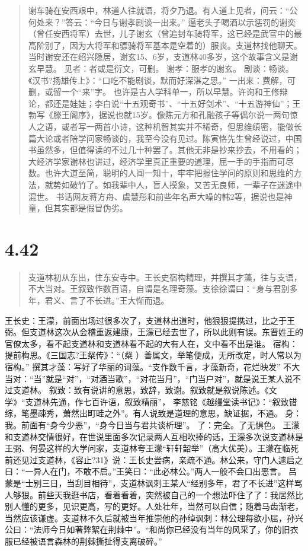 \documentclass[]{book}
\begin{document}
\begin{quote}
谢车骑在安西艰中，林道人往就语，将夕乃退。有人道上见者，问云：``公何处来？''答云：``今日与谢孝剧谈一出来。''
逼老头子喝酒以示惩罚的谢奕（曾任安西将军）去世，儿子谢玄（曾追封车骑将军，这已经是武官中的最高阶别了，因为大将军和骠骑将军基本是空着的）服丧。支道林找他聊天。当时谢安还在绍兴隐居，谢玄15、6岁，支道林40多岁，这个故事含义是谢玄早慧。
见者：者或是衍文，可删。 谢孝：服孝的谢玄。
剧谈：畅谈。《汉书?扬雄传上》：``口吃不能剧谈，默而好深湛之思。''
一出来：费解，可删，或留一个``来''字。
也许是古人学科单一，所以早慧。许询和王修辩论，都还是娃娃；李白说``十五观奇书''、``十五好剑术''、``十五游神仙''；王勃写《滕王阁序》，据说也就15岁。像陈元方和孔融孩子等偶尔说一两句惊人之语，或者写一两首小诗，这种机智其实并不稀奇，但思维缜密，能做长篇大论或者陪学问家畅谈的，我至今没有见过。陈寅恪先生曾经说过，中国书虽然多，但值得读的不过几十种罢了。其他无非是抄来抄去，不用看的；大经济学家谢林也讲过，经济学里真正重要的道理，屈一手的手指而可尽数。也许大道至简，聪明的人闻一知十，牢牢把握住学问的原则和思维的方法，就势如破竹了。如我辈中人，盲人摸象，又苦无良师，一辈子在迷途中混世。
书话网友蒋方舟、虞慧彤和前些年名声大噪的韩2等，据说也是神童，但其实都是假冒伪劣。
\end{quote}

\section{4.42}\label{section-220}

\begin{quote}
支道林初从东出，住东安寺中。王长史宿构精理，并撰其才藻，往与支语，不大当对。王叙致作数百语，自谓是名理奇藻。支徐徐谓曰：``身与君别多年，君义、言了不长进。''王大惭而退。
\end{quote}

王长史：王濛，前面出场过很多次了，支道林出道时，他狠狠提携过，比之于王弼。但支道林这次从会稽重返建康，王濛已经去世了，所以此则有误。东晋姓王的官僚太多，看不起支道林和支道林看不起的大有人在，文中看不出是谁。
宿构：提前构思。《三国志?王粲传》：``（粲
）善属文，举笔便成，无所改定，时人常以为宿构。''
撰其才藻：写好了华丽的词藻。``支作数千言，才藻新奇，花烂映发''
不大当对：``当''就是``对''，``对酒当歌''，``对花当月''，``门当户对''，就是说王某人说不过支道林。
叙致：致有说讲的意思，致辞，致谢。叙致就是叙说陈述。《文学》``支道林先通，作七百许语，叙致精丽''，
李慈铭《越缦堂读书记》：``叙致错综，笔墨疎秀，萧然出町畦之外''。有人说致是道理的意思，缺证据，不通。
身：我。前面有``身今少恶''，``身今日当与君共谈析理''。
了：完全。了无惧色。
王濛和支道林交情很好，在世说里面多次记录两人互相吹捧的话，王濛多次说支道林是王弼、何晏这样的大学问家，支道林夸王濛``轩轩韶举''（高大优美）。王濛在临死前还见过支道林，《容止?31》说：王长史尝病，亲疏不通。林公来，守门人遽启之曰：``一异人在门，不敢不启。''王笑曰：``此必林公。''两人一般不会口出恶言。
吕蒙是``士别三日，当刮目相待''，支道林讽刺王某人``经别多年，君了不长进''这样骂人够狠。前些天我逛书店，看着看着，突然被自己的一个想法吓住了了：我居然比别人懂的更多，见识更高，写的更好。人处壮年，当然可以自信；随着马齿渐老，当然应该谦虚。支道林不久后就被当年推崇他的孙绰讽刺：林公理每欲小屈，孙兴公曰：``法师今日如著弊絮在荆棘中''。``和尚你已经没有当年的风采了，你的旧衣服已经被语言森林的荆棘撕扯得支离破碎。''
\end{document}
